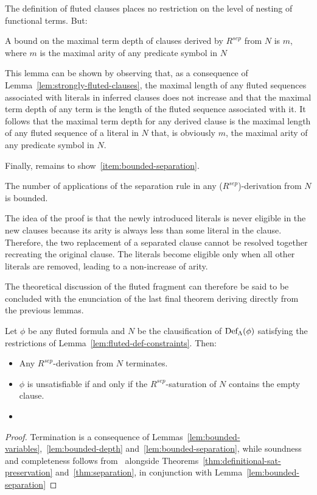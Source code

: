 The definition of fluted clauses places no restriction on the level of nesting
of functional terms. But:
\begin{lemma}\label{lem:bounded-depth}
  A bound on the maximal term depth of clauses derived by \(R^{sep}\) from \(N\) is \(m\), where \(m\) is the maximal arity of any predicate symbol in \(N\)
\end{lemma}
This lemma can be shown by observing that, as a consequence of Lemma~\ref{lem:strongly-fluted-clauses}, the maximal length of any fluted sequences associated with literals in inferred clauses does not increase and that the maximal term depth of any term is the length of the fluted sequence associated with it.
It follows that the maximal term depth for any derived clause is the maximal length of any fluted sequence of a literal in \(N\) that, is obviously \(m\), the maximal arity of any predicate symbol in \(N\).

Finally, remains to show~\ref{item:bounded-separation}.

\begin{lemma}\label{lem:bounded-separation}
  The number of applications of the separation rule in any (\(R^{sep}\))-derivation from \(N\) is bounded.
\end{lemma}

The idea of the proof is that the newly introduced literals is never eligible in the new clauses because its arity is always less than some literal in the clause.
Therefore, the two replacement of a separated clause cannot be resolved together recreating the original clause. The literals become eligible only when all other  literals are removed, leading to a non-increase of arity.

The theoretical discussion of the fluted fragment can therefore be said to be concluded with the enunciation of the last final theorem deriving directly from the previous lemmas.

\begin{theorem}
  Let \(\phi\) be any fluted formula and \(N\) be the clausification of \(\fldef{\Lambda}{\phi}\) satisfying the restrictions of Lemma~\ref{lem:fluted-def-constraints}.
  Then:
  \begin{itemize}
    \item Any \(R^{sep}\)-derivation from \(N\) terminates.
    \item \(\phi\) is unsatisfiable if and only if the \(R^{sep}\)-saturation of \(N\) contains the empty clause.
    \item 
  \end{itemize}
\end{theorem}

\begin{proof}
  Termination is a consequence of Lemmas~\ref{lem:bounded-variables},~\ref{lem:bounded-depth} and~\ref{lem:bounded-separation}, while soundness and completeness follows from~\cite{robinson1965} alongside Theorems~\ref{thm:definitional-sat-preservation} and~\ref{thm:separation}, in conjunction with Lemma~\ref{lem:bounded-separation}
\end{proof}



